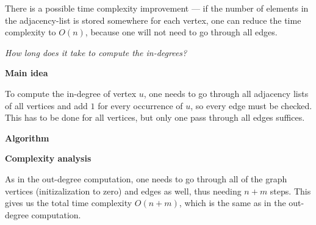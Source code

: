 There is a possible time complexity improvement --- if the number of elements
in the adjacency-list is stored somewhere for each vertex, one can reduce the
time complexity to $O(n)$, because one will not need to go through all edges.

\textit{How long does it take to compute the in-degrees?}

\textbf{Main idea}

To compute the in-degree of vertex $u$, one needs to go through all adjacency
lists of all vertices and add $1$ for every occurrence of $u$, so every edge
must be checked. This has to be done for all vertices, but only one pass
through all edges suffices.

\textbf{Algorithm}

\begin{algorithm}[H]

\end{algorithm}

\textbf{Complexity analysis}

As in the out-degree computation, one needs to go through all of the graph
vertices (initizalization to zero) and edges as well, thus needing $n + m$
steps. This gives us the total time complexity $O(n + m)$, which is the same as
in the out-degree computation.

